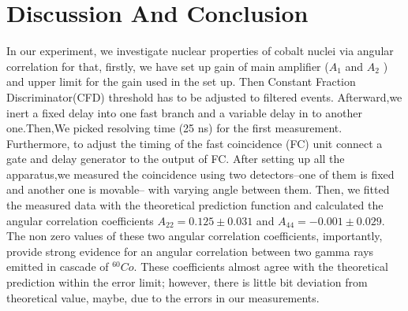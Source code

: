 \section{Discussion And Conclusion}
In our experiment, we investigate nuclear properties of cobalt nuclei via angular correlation for that, firstly, we have set up gain of main amplifier ($ A_{1} $ and $ A_{2} $ ) and upper limit for the gain used in the set up. Then Constant Fraction Discriminator(CFD) threshold has to be adjusted to filtered events. Afterward,we inert a fixed delay into one fast branch and a variable delay in to another one.Then,We picked resolving time (25 ns) for the first measurement. Furthermore, to adjust the timing of the fast coincidence (FC) unit connect a gate and delay generator to the output of FC.
After setting up all the apparatus,we measured the coincidence using two detectors--one of them is fixed and another one is movable-- with varying angle between them. Then, we fitted the measured data with the theoretical prediction function and calculated the angular correlation coefficients $ A_{22}= 0.125\pm 0.031 $ and $A_{44}=-0.001\pm 0.029  $. The non zero values of these two angular correlation coefficients, importantly, provide strong evidence for an angular correlation between two gamma rays emitted in cascade of $ ^{60}Co $. These coefficients almost agree with the theoretical prediction within the error limit; however, there is little bit deviation from theoretical value, maybe,  due to the errors in our measurements. 